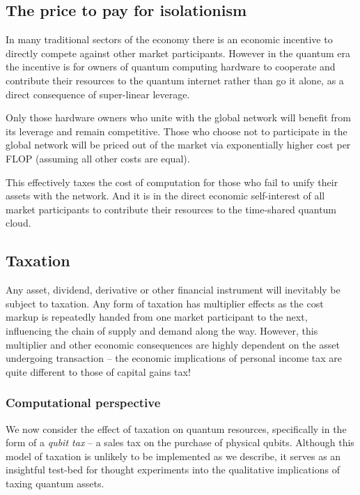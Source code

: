 %
%

\subsection{The price to pay for isolationism}

In many traditional sectors of the economy there is an economic incentive to directly compete against other market participants. However in the quantum era the incentive is for owners of quantum computing hardware to cooperate and contribute their resources to the quantum internet rather than go it alone, as a direct consequence of super-linear leverage.

Only those hardware owners who unite with the global network will benefit from its leverage and remain competitive. Those who choose not to participate in the global network will be priced out of the market via exponentially higher cost per FLOP (assuming all other costs are equal).

This effectively taxes the cost of computation for those who fail to unify their assets with the network. And it is in the direct economic self-interest of all market participants to contribute their resources to the time-shared quantum cloud.

%
%

\subsection{Taxation}\label{sec:taxation}

Any asset, dividend, derivative or other financial instrument will inevitably be subject to taxation. Any form of taxation has multiplier effects as the cost markup is repeatedly handed from one market participant to the next, influencing the chain of supply and demand along the way. However, this multiplier and other economic consequences are highly dependent on the asset undergoing transaction -- the economic implications of personal income tax are quite different to those of capital gains tax!

\subsubsection{Computational perspective}

We now consider the effect of taxation on quantum resources, specifically in the form of a \textit{qubit tax} -- a sales tax on the purchase of physical qubits. Although this model of taxation is unlikely to be implemented as we describe, it serves as an insightful test-bed for thought experiments into the qualitative implications of taxing quantum assets.

